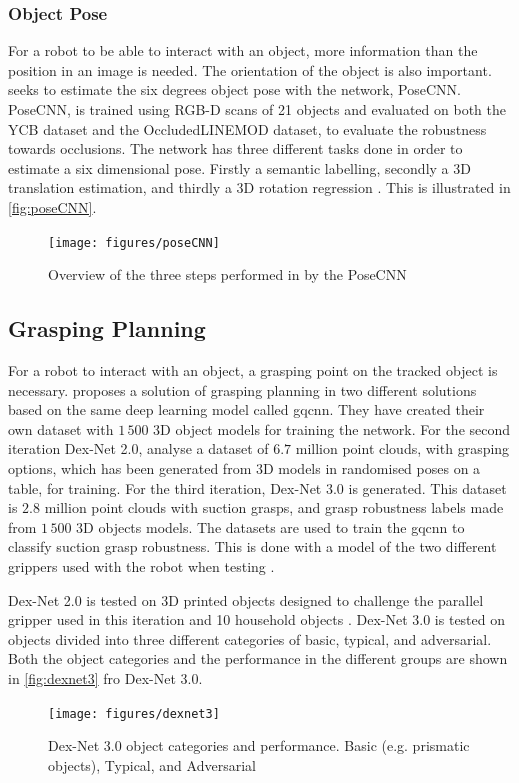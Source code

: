 \subsubsection{Object Pose}
For a robot to be able to interact with an object, more information than the position in an image is needed. The orientation of the object is also important. \cite{Xiang2017} seeks to estimate the six degrees object pose with the network, PoseCNN. PoseCNN, is trained using RGB-D scans of 21 objects and evaluated on both the YCB dataset and the OccludedLINEMOD dataset, to evaluate the robustness towards occlusions. The network has three different tasks done in order to estimate a six dimensional pose. Firstly a semantic labelling, secondly a 3D translation estimation, and thirdly a 3D rotation regression \citep{Xiang2017}. This is illustrated in \autoref{fig:poseCNN}.

\begin{figure}[H]
	\centering
	\texttt{[image: figures/poseCNN]}
	\caption{Overview of the three steps performed in by the PoseCNN \citep{Xiang2017}}
	\label{fig:poseCNN}
\end{figure}

\subsection{Grasping Planning}
For a robot to interact with an object, a grasping point on the tracked object is necessary. \cite{Mahler2017} proposes a solution of grasping planning in two different solutions based on the same deep learning model called \gls{gqcnn}. They have created their own dataset with $1\,500$ 3D object models for training the network. For the second iteration Dex-Net 2.0, \cite{Mahler2017} analyse a dataset of $6.7$ million point clouds, with grasping options, which has been generated from 3D models in randomised poses on a table, for training. For the third iteration, Dex-Net 3.0 is generated. This dataset is $2.8$ million point clouds with suction grasps, and grasp robustness labels made from $1\,500$ 3D objects models. The datasets are used to train the \gls{gqcnn} to classify suction grasp robustness. This is done with a model of the two different grippers used with the robot when testing \citep{Dexnet3}. 

Dex-Net 2.0 is tested on 3D printed objects designed to challenge the parallel gripper used in this iteration and 10 household objects \citep{Mahler2017}. Dex-Net 3.0 is tested on objects divided into three different categories of basic, typical, and adversarial. Both the object categories and the performance in the different groups are shown in \autoref{fig:dexnet3} fro Dex-Net 3.0.

\begin{figure}[H]
	\centering
	\texttt{[image: figures/dexnet3]}
	\caption{Dex-Net 3.0 object categories and performance. Basic (e.g. prismatic objects), Typical, and Adversarial \citep{Dexnet3}}
	\label{fig:dexnet3}
\end{figure}
